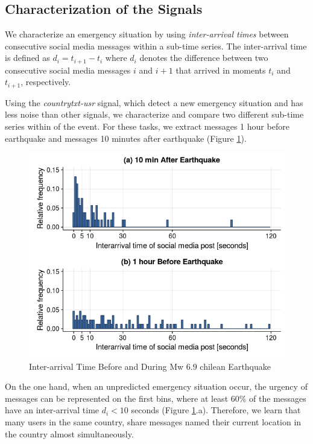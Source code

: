 \documentclass[letterpaper]{article} %
\begin{document}
\subsection{Characterization of the Signals}

We characterize an emergency situation by using \textit{inter-arrival times} between consecutive social media messages within a sub-time series. The inter-arrival time is defined as $d_{i} = t_{i+1} - t_{i}$ where $d_{i}$ denotes the difference between two consecutive social media messages $i$ and $i+1$ that arrived in moments $t_{i}$ and $t_{i+1}$, respectively.

Using the \textit{countrytxt-usr} signal, which detect a new emergency situation and has less noise than other signals, we characterize and compare two different sub-time series within of the event. For these tasks, we extract messages 1 hour before earthquake and messages 10 minutes after earthquake (Figure \ref{interarrival}). 
\begin{figure}[h]
	\centering
	\includegraphics[width=\columnwidth]{interarrival.png}
	\caption{Inter-arrival Time Before and During Mw 6.9 chilean Earthquake}
	\label{interarrival}
\end{figure}

On the one hand, when an unpredicted emergency situation occur, the urgency of messages can be represented on the first bins, where at least $60\%$ of the messages have an inter-arrival time $d_{i} < 10$ seconds (Figure \ref{interarrival}.a). Therefore, we learn that many users in the same country, share messages named their current location in the country almost simultaneously.
\end{document}
